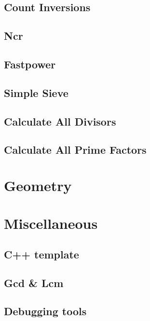 \subsection{Count Inversions}
\raggedbottom
\hrulefill
\subsection{Ncr}
\raggedbottom
\hrulefill
\subsection{Fastpower}
\raggedbottom
\hrulefill
\subsection{Simple Sieve}
\raggedbottom
\hrulefill
\subsection{Calculate All Divisors}
\raggedbottom
\hrulefill
\subsection{Calculate All Prime Factors}
\raggedbottom
\hrulefill

\section{Geometry}

\section{Miscellaneous}
\subsection{C++ template}
\raggedbottom
\hrulefill
\subsection{Gcd \& Lcm}
\raggedbottom
\hrulefill
\subsection{Debugging tools}
\raggedbottom
\hrulefill
